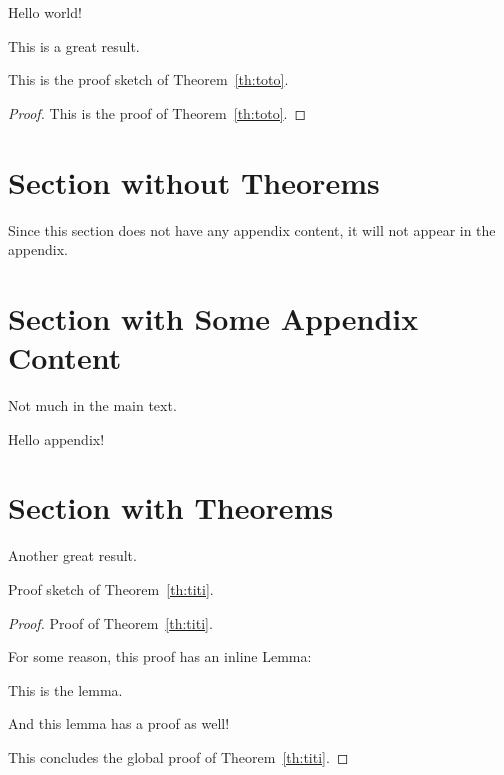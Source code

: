 \usepackage{hyperref}


\renewcommand{\appendixsectionformat}[2]{Material for #2 (Section~#1)}


Hello world!

\begin{theoremrep}
  \label{th:toto}
  This is a great result.
\end{theoremrep}

\begin{proofsketch}
  This is the proof sketch of Theorem~\ref{th:toto}.
\end{proofsketch}

\begin{proof}
  This is the proof of Theorem~\ref{th:toto}.
\end{proof}

\section{Section without Theorems}

Since this section does not have any appendix content, it will not appear in the
appendix. \cite{brin1998anatomy}

\section{Section with Some Appendix Content}

Not much in the main text.

\begin{toappendix}
  Hello appendix!
\end{toappendix}

\section{Section with Theorems}

\begin{theoremrep}
  \label{th:titi}
  Another great result.
\end{theoremrep}

\begin{proofsketch}
  Proof sketch of Theorem~\ref{th:titi}.
\end{proofsketch}

\begin{proof}
  Proof of Theorem~\ref{th:titi}.

  For some reason, this proof has an inline Lemma:
  \begin{lemma}
    This is the lemma.
  \end{lemma} 

  \begin{nestedproof}
    And this lemma has a proof as well!
  \end{nestedproof}

  This concludes the global proof of Theorem~\ref{th:titi}.
\end{proof}

